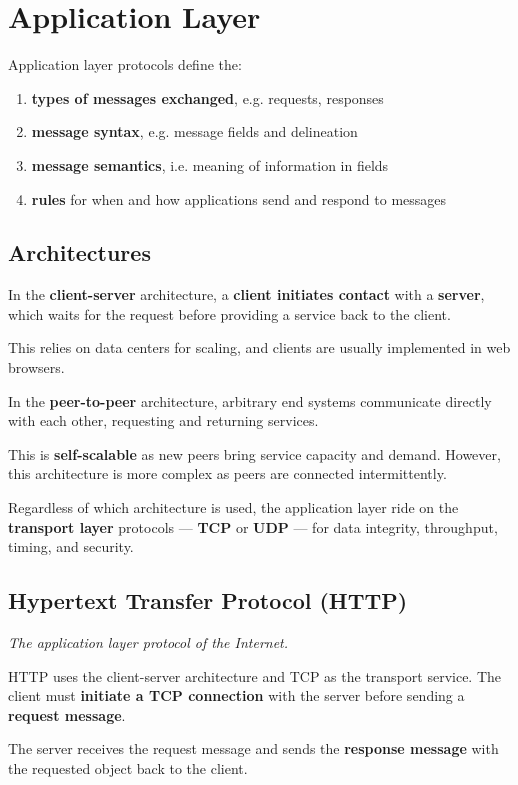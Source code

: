 \section{Application Layer}
Application layer protocols define the:
\begin{enumerate}
    \item \textbf{types of messages exchanged}, e.g. requests, responses
    \item \textbf{message syntax}, e.g. message fields and delineation
    \item \textbf{message semantics}, i.e. meaning of information in fields
    \item \textbf{rules} for when and how applications send and respond to messages
\end{enumerate}


\subsection{Architectures}
In the \textbf{client-server} architecture, a \textbf{client initiates contact} with a \textbf{server},
which waits for the request before providing a service back to the client.

This relies on data centers for scaling, and clients are usually implemented in web browsers.

In the \textbf{peer-to-peer} architecture, arbitrary end systems communicate directly with each other,
requesting and returning services.

This is \textbf{self-scalable} as new peers bring service capacity and demand.
However, this architecture is more complex as peers are connected intermittently.

Regardless of which architecture is used, the application layer ride on the \textbf{transport layer} protocols
--- \textbf{TCP} or \textbf{UDP} --- for data integrity, throughput, timing, and security.


\subsection{Hypertext Transfer Protocol (HTTP)}
\emph{The application layer protocol of the Internet.}

HTTP uses the client-server architecture and TCP as the transport service.
The client must \textbf{initiate a TCP connection} with the server before sending a \textbf{request message}.

The server receives the request message and sends the \textbf{response message} with the requested object
back to the client.

